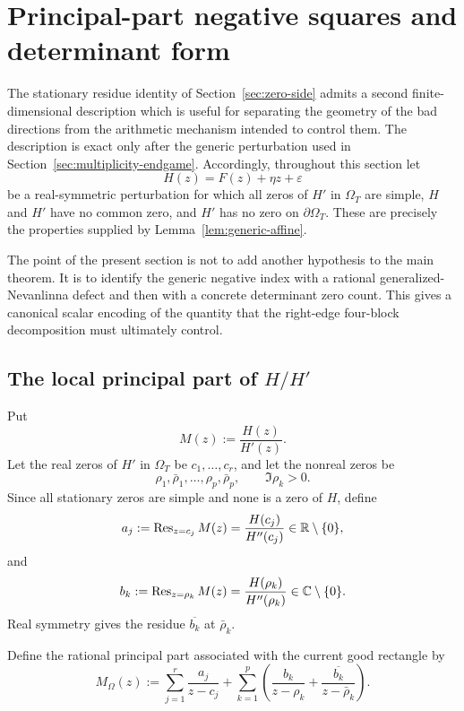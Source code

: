 \section{Principal-part negative squares and determinant form}
\label{sec:negative-square-rewrite}

The stationary residue identity of Section~\ref{sec:zero-side} admits a second
finite-dimensional description which is useful for separating the geometry of
the bad directions from the arithmetic mechanism intended to control them.
The description is exact only after the generic perturbation used in
Section~\ref{sec:multiplicity-endgame}.  Accordingly, throughout this section
let
\[
H(z)=F(z)+\eta z+\varepsilon
\]
be a real-symmetric perturbation for which all zeros of $H'$ in
$\Omega_T$ are simple, $H$ and $H'$ have no common zero, and $H'$ has no zero
on $\partial\Omega_T$.  These are precisely the properties supplied by
Lemma~\ref{lem:generic-affine}.

The point of the present section is not to add another hypothesis to the main
theorem.  It is to identify the generic negative index with a rational
generalized-Nevanlinna defect and then with a concrete determinant zero count.
This gives a canonical scalar encoding of the quantity that the right-edge
four-block decomposition must ultimately control.

\subsection{The local principal part of $H/H'$}

Put
\begin{equation}
M(z):=\frac{H(z)}{H'(z)}.
\label{eq:full-M-H-over-Hprime}
\end{equation}
Let the real zeros of $H'$ in $\Omega_T$ be
$c_1,\dots,c_r$, and let the nonreal zeros be
\[
\rho_1,\bar\rho_1,\dots,\rho_p,\bar\rho_p,
\qquad \Im\rho_k>0.
\]
Since all stationary zeros are simple and none is a zero of $H$, define
\[
a_j:=\operatorname{Res}_{z=c_j}M(z)=\frac{H(c_j)}{H''(c_j)}
\in\mathbb R\setminus\{0\},
\]
and
\[
b_k:=\operatorname{Res}_{z=\rho_k}M(z)=\frac{H(\rho_k)}{H''(\rho_k)}
\in\mathbb C\setminus\{0\}.
\]
Real symmetry gives the residue $\overline{b_k}$ at $\bar\rho_k$.

Define the rational principal part associated with the current good rectangle by
\begin{equation}
\boxed{
M_{\Omega}(z)
:=
\sum_{j=1}^{r}\frac{a_j}{z-c_j}
+
\sum_{k=1}^{p}
\left(
\frac{b_k}{z-\rho_k}
+
\frac{\overline{b_k}}{z-\bar\rho_k}
\right).
}
\label{eq:M-Omega-principal-part}
\end{equation}

